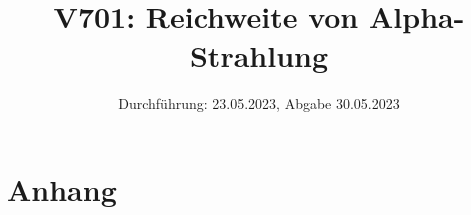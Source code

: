 

\title{V701: Reichweite von Alpha-Strahlung}
\date{Durchführung: 23.05.2023, Abgabe 30.05.2023}


\maketitle
\thispagestyle{empty} 
\tableofcontents
\newpage
\setcounter{page}{1}






\printbibliography
\newpage

\section*{Anhang}


